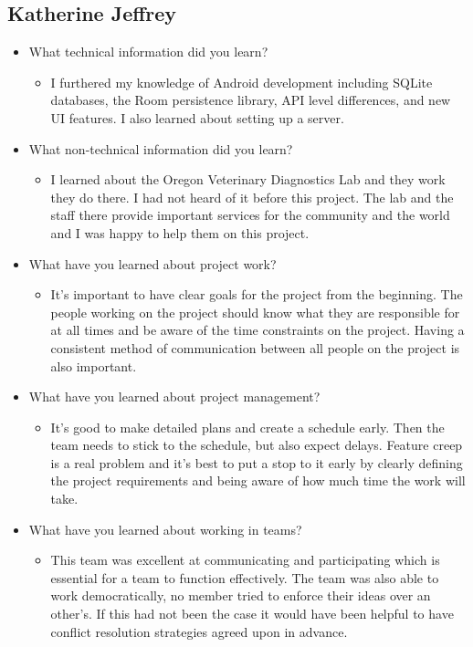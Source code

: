 \documentclass[onecolumn, draftclsnofoot,10pt, compsoc]{IEEEtran}
\begin{document}
  \subsection{Katherine Jeffrey}
 \begin{itemize}
     \item What technical information did you learn?
     \begin{itemize}
         \item I furthered my knowledge of Android development including SQLite databases, the Room persistence library, API level differences, and new UI features. I also learned about setting up a server. 
     \end{itemize}
     \item What non-technical information did you learn?
     \begin{itemize}
         \item I learned about the Oregon Veterinary Diagnostics Lab and they work they do there. I had not heard of it before this project. The lab and the staff there provide important services for the community and the world and I was happy to help them on this project. 
     \end{itemize}
     \item What have you learned about project work?
     \begin{itemize}
         \item It's important to have clear goals for the project from the beginning. The people working on the project should know what they are responsible for at all times and be aware of the time constraints on the project. Having a consistent method of communication between all people on the project is also important. 
     \end{itemize}
     \item What have you learned about project management?
     \begin{itemize}
         \item It's good to make detailed plans and create a schedule early. Then the team needs to stick to the schedule, but also expect delays. Feature creep is a real problem and it's best to put a stop to it early by clearly defining the project requirements and being aware of how much time the work will take. 
     \end{itemize}
     \item What have you learned about working in teams?
     \begin{itemize}
         \item This team was excellent at communicating and participating which is essential for a team to function effectively. The team was also able to work democratically, no member tried to enforce their ideas over an other's. If this had not been the case it would have been helpful to have conflict resolution strategies agreed upon in advance. 

\end{itemize}
\end{itemize}
\end{document}
